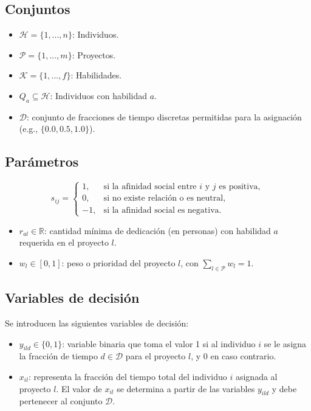 \documentclass[conference]{IEEEtran}
\begin{document}
\subsection{Conjuntos}
\begin{itemize}
    \item $\mathcal{H} = \{1, ..., n\}$: Individuos.
    \item $\mathcal{P} = \{1, ..., m\}$: Proyectos.
    \item $\mathcal{K} = \{1, ..., f\}$: Habilidades.
    \item $Q_a \subseteq \mathcal{H}$: Individuos con habilidad $a$.
    \item $\mathcal{D}$: conjunto de fracciones de tiempo discretas permitidas para la asignación (e.g., $\{0.0, 0.5, 1.0\}$).
\end{itemize}

\subsection{Parámetros}
\[
    s_{ij} =
    \begin{cases}
        1,  & \text{si la afinidad social entre } i \text{ y } j \text{ es positiva}, \\
        0,  & \text{si no existe relación o es neutral},                              \\
        -1, & \text{si la afinidad social es negativa}.
    \end{cases}
\]
\begin{itemize}
    \item $r_{al} \in \mathbb{R}$: cantidad mínima de dedicación (en personas) con habilidad $a$ requerida en el proyecto $l$.
    \item $w_l \in [0,1]$: peso o prioridad del proyecto $l$, con $\sum_{l \in \mathcal{P}} w_l = 1$.
\end{itemize}

\subsection{Variables de decisión}


Se introducen las siguientes variables de decisión:
\begin{itemize}
    \item \(y_{ild} \in \{0,1\}\): variable binaria que toma el valor 1 si al individuo \(i\) se le asigna la fracción de tiempo \(d \in \mathcal{D}\) para el proyecto \(l\), y 0 en caso contrario.
    \item \(x_{il}\): representa la fracción del tiempo total del individuo \(i\) asignada al proyecto \(l\). El valor de \(x_{il}\) se determina a partir de las variables \(y_{ild}\) y debe pertenecer al conjunto \(\mathcal{D}\).
\end{itemize}
\end{document}
